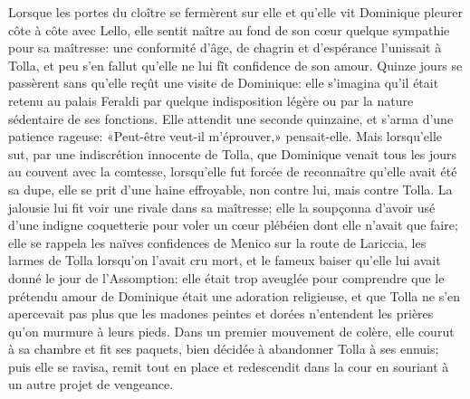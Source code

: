 Lorsque les portes du cloître se fermèrent sur elle et qu'elle vit Dominique pleurer côte à côte avec Lello, elle sentit naître au fond de son c\oe{}ur quelque sympathie pour sa maîtresse: une conformité d'âge, de chagrin et d'espérance l'unissait à Tolla, et peu s'en fallut qu'elle ne lui fît confidence de son amour. Quinze jours se passèrent sans qu'elle reçût une visite de Dominique: elle s'imagina qu'il était retenu au palais Feraldi par quelque indisposition légère ou par la nature sédentaire de ses fonctions. Elle attendit une seconde quinzaine, et s'arma d'une patience rageuse: «Peut-être veut-il m'éprouver,» pensait-elle. Mais lorsqu'elle sut, par une indiscrétion innocente de Tolla, que Dominique venait tous les jours au couvent avec la comtesse, lorsqu'elle fut forcée de reconnaître qu'elle avait été sa dupe, elle se prit d'une haine effroyable, non contre lui, mais contre Tolla. La jalousie lui fit voir une rivale dans sa maîtresse; elle la soupçonna d'avoir usé d'une indigne coquetterie pour voler un c\oe{}ur plébéien dont elle n'avait que faire; elle se rappela les naïves confidences de Menico sur la route de Lariccia, les larmes de Tolla lorsqu'on l'avait cru mort, et le fameux baiser qu'elle lui avait donné le jour de l'Assomption: elle était trop aveuglée pour comprendre que le prétendu amour de Dominique était une adoration religieuse, et que Tolla ne s'en apercevait pas plus que les madones peintes et dorées n'entendent les prières qu'on murmure à leurs pieds. Dans un premier mouvement de colère, elle courut à sa chambre et fit ses paquets, bien décidée à abandonner Tolla à ses ennuis; puis elle se ravisa, remit tout en place et redescendit dans la cour en souriant à un autre projet de vengeance.


